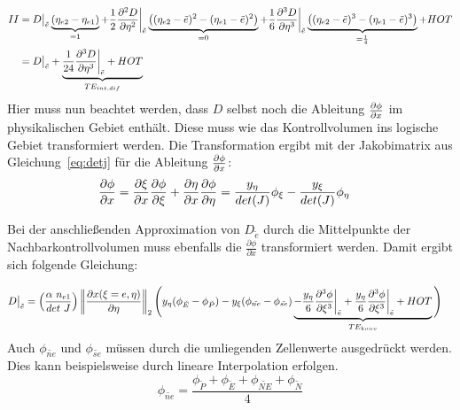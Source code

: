 \begin{align*}
  II&= D\big\vert_{\tilde{e}} \underbrace{(\etaii-\etai)}_{=1} + \frac{1}{2}
  \frac{\partial^2 D}{\partial \eta^2} \bigg\vert_{\tilde{e}}
  \underbrace{\left({(\etaii-\etilde)^2-(\etai-\etilde)^2}\right)}_{=0}
  +\frac{1}{6} \frac{\partial^3 D}{\partial \eta^3}\bigg\vert_{\tilde{e}}
  \underbrace{\left({(\etaii-\etilde)^3-(\etai-\etilde)^3}\right)}_{=\frac{1}{4}} + HOT\\
  &= D \big\vert_{\tilde{e}}+ \underbrace{\frac{1}{24}  \frac{\partial^3 D}{\partial \eta^3}
\bigg\vert_{\tilde{e}}+HOT}_{TE_{int, dif}}
\end{align*}
Hier muss nun beachtet werden, dass $D$ selbst noch die Ableitung $\pder[\phi]{x}$ im physikalischen Gebiet enthält.
Diese muss wie das Kontrollvolumen ins logische Gebiet transformiert werden. Die Transformation ergibt
mit der Jakobimatrix aus Gleichung~\eqref{eq:detj} für
die Ableitung $\pder[\phi]{x}$:%
\begin{align}
  \pder[\phi]{x}&=\pder[\xi]{x}\pder[\phi]{\xi}+\pder[\eta]{x}\pder[\phi]{\eta}
  = \frac{\yeta}{det(J)} \phi_{\xi} - \frac{\yxi}{det(J)} \phi_{\eta}
\end{align}

Bei der anschließenden Approximation von $D_{\tilde{e}}$ durch die Mittelpunkte der Nachbarkontrollvolumen
muss ebenfalls die $\frac{\partial \phi}{\partial x}$ transformiert werden. Damit ergibt sich folgende Gleichung:




\begin{align*}
  D\big\vert_{\etilde} &=
  \left({\frac{\alpha\ n_{e1}}{det\ J}}\right)
  \left\lVert \frac{\partial x(\xi=e, \eta)}{\partial \eta} \right\rVert_2 
  \Bigg(\yeta(\phi_{\tilde{E}}-\phi_{\tilde{P}}) - \yxi(\phi_{\tilde{ne}}-\phi_{\tilde{se}})
      \underbrace{ -\frac{\yeta}{6} \frac{\partial^3 \phi}{\partial \xi^3} \bigg\vert_{\etilde}
      +\frac{\yeta}{6} \frac{\partial^3 \phi}{\partial \xi^3} \bigg\vert_{\etilde}
+ HOT}_{TE_{konv}}\Bigg)
\end{align*}
Auch $\phi_{\tilde{ne}}$ und $\phi_{\tilde{se}}$ müssen durch die umliegenden Zellenwerte ausgedrückt werden.
Dies kann beispielsweise durch lineare Interpolation erfolgen.
\begin{equation}
\phi_{\tilde{ne}} = \frac{\phi_{\tilde{P}} +\phi_{\tilde{E}} + \phi_{\tilde{NE}}+ \phi_{\tilde{N}}}{4} 
\end{equation}


